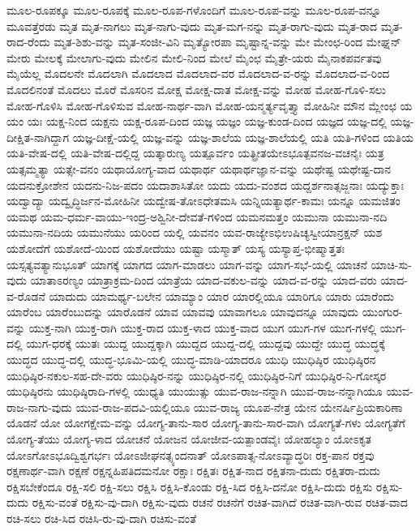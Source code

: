 {ಮೂಲ-ರೂಪಕ್ಕೂ
ಮೂಲ-ರೂಪಕ್ಕೆ
ಮೂಲ-ರೂಪ-ಗಳೊಂದಿಗೆ
ಮೂಲ-ರೂಪ-ವನ್ನು
ಮೂಲ-ರೂಪ-ವನ್ನೂ
ಮೂವತ್ತೆರಡು
ಮೃತ
ಮೃತ-ನಾಗಲು
ಮೃತ-ನಾಗು-ವುದು
ಮೃತ-ಮಗ-ನನ್ನು
ಮೃತ-ರಾಗು-ವುದು
ಮೃತ-ರಾದ
ಮೃತ-ರಾದ-ರೆಂದು
ಮೃತ-ಶಿಶು-ವನ್ನು
ಮೃತ-ಸಂಜೀ-ವಿನಿ
ಮೃತ್ಯೋರಪಾ
ಮೃಷ್ಟಾನ್ನ-ವನ್ನು
ಮೇ
ಮೇಂಛ-ರಿಂದ
ಮೇಘ್ನನ್
ಮೇರು
ಮೇಲಕ್ಕೆ
ಮೇಲಾಗು-ವುದು
ಮೇಲಿನ
ಮೇಲಿ-ನಿಂದ
ಮೇಲೆ
ಮೈಂಛ
ಮೈತ್ರೇ-ಯರು
ಮೈನಾಕಪರ್ವತವು
ಮೈಯೆಲ್ಲ
ಮೊದಲನೇ
ಮೊದಲಾಗಿ
ಮೊದಲಾದ
ಮೊದಲಾದ-ವರ
ಮೊದಲಾದ-ವ-ರನ್ನು
ಮೊದಲಾದ-ವ-ರಿಂದ
ಮೊದಲಿನಂತೆ
ಮೊದಲು
ಮೊರೆ
ಮೊಸರಿನ
ಮೋಕ್ಷ
ಮೋಕ್ಷ-ದಾತ
ಮೋಕ್ಷ-ವನ್ನು
ಮೋಹ
ಮೋಹ-ಗೊಳಿ-ಸಲು
ಮೋಹ-ಗೊಳಿಸಿ
ಮೋಹ-ಗೊಳಿಸುವ
ಮೋಹ-ನಾರ್ಥ-ವಾಗಿ
ಮೋಹ-ಯನ್ಮರ್ತ್ಯವೃತ್ತ್ಯಾ
ಮೋಹಿನೀ
ಮೌನ
ಮ್ಲೇಂಛ
ಯ
ಯಂ
ಯಃ
ಯಕ್ಷ-ನಿಂದ
ಯಕ್ಷನು
ಯಕ್ಷ-ರೂಪ-ದಿಂದ
ಯಜ್ಞ
ಯಜ್ಞಂ
ಯಜ್ಞ-ಕುಂಡ-ದಿಂದ
ಯಜ್ಞದ
ಯಜ್ಞ-ದಲ್ಲಿ
ಯಜ್ಞ-ದೀಕ್ಷಿತ-ನಾಗಿದ್ದಾಗ
ಯಜ್ಞ-ದೀಕ್ಷೆ-ಯಲ್ಲಿ
ಯಜ್ಞ-ವನ್ನು
ಯಜ್ಞ-ಶಾಲೆಯ
ಯಜ್ಞ-ಶಾಲೆಯಲ್ಲಿ
ಯತಿ
ಯತಿ-ಗಳಿಂದ
ಯತಿಯ
ಯತಿ-ವೇಷ-ದಲ್ಲಿ
ಯತಿ-ವೇಷ-ದಲ್ಲಿದ್ದ
ಯತ್ಕಾರುಣ್ಯ
ಯತ್ಪೂರ್ವಂ
ಯತ್ಪ್ರೀತಯೇಽಭೂತ್ಪವನಜ-ವಚನೈಃ
ಯತ್ರ
ಯತ್ಸಮ್ಮತ್ಯಾ
ಯತ್ಸೇ-ವನಂ
ಯಥಾಯೋಗ್ಯ-ವಾದ
ಯಥಾರ್ಥ
ಯಥಾರ್ಥಜ್ಞಾನ-ವನ್ನು
ಯಥೇಷ್ಟ
ಯಥೇಷ್ಟ-ದಾನ
ಯದನುಕ್ರೋಶೇನ
ಯದನು-ನಿಜ-ಪದಂ
ಯದಾಶಾಸಿತೋ
ಯದು
ಯದು-ವಂಶದ
ಯದ್ದರ್ಶನಾತ್ಸಜ್ಜನಾಃ
ಯದ್ಯುಕ್ತಾಃ
ಯದ್ವಾದ್ಯಾ
ಯದ್ವೃದ್ಧಿರ್ಜನ-ಮೋಹಿನೀ
ಯದ್ವೇಷ-ತೋಽಧೇತಮಸಿ
ಯನ್ನಿಯತ್ಯಾರ್ಥ-ಕಾಮಃ
ಯನ್ನೂ
ಯಮಜಿತಂ
ಯಮಥ
ಯಮ-ಧರ್ಮ-ವಾಯು-ಇಂದ್ರ-ಅಶ್ವಿನೀ-ದೇವತೆ-ಗಳಿಂದ
ಯಮನಮತ್ತಂ
ಯಮುನಾ
ಯಮುನಾ-ನದಿ
ಯಮುನಾ-ನದಿಯ
ಯಮುನೆಯು
ಯರಿಂದ
ಯಲ್ಲಿ
ಯವನಂ
ಯವ-ರಾಜ್ಯೇಽಭಿಉಷಿಚ್ಯಸ್ವೀಯಾನ್ರಕ್ಷನ್
ಯಶ
ಯಶೋದೆಗೆ
ಯಶೋದೆ-ಯಿಂದ
ಯಶೋದೆಯು
ಯಷ್ಟಾ
ಯಸ್ಮಾತ್
ಯಸ್ಯ
ಯಸ್ಯಾಪ್ತ-ಭೀಷ್ಮಾತ್ತತಃ
ಯಸ್ಸತ್ಯವತ್ಯಾನುಭೂತ್
ಯಾಗಕ್ಕೆ
ಯಾಗದ
ಯಾಗ-ಮಾಡಲು
ಯಾಗ-ವನ್ನು
ಯಾಗ-ಸಭೆ-ಯಲ್ಲಿ
ಯಾಚನೆ
ಯಾಚಿ-ಸು-ವುದು
ಯಾತಾಽರಣ್ಯಂ
ಯಾತ್ರಾಕ್ರಮ-ದಿಂದ
ಯಾತ್ರೆಯ
ಯಾದ-ವಕುಲ-ವನ್ನು
ಯಾದ-ವ-ರನ್ನು
ಯಾದ-ವರು
ಯಾದ-ವ-ರೊಡನೆ
ಯಾದುದು
ಯಾಮರ್ಥ್ಯ-ಬಲೇನ
ಯಾಮ್ಯಾಂ
ಯಾರ
ಯಾರಲ್ಲಿಯೂ
ಯಾರಿಗೂ
ಯಾರು
ಯಾರೆಂದು
ಯಾರೆಂಬ
ಯಾರೆಂಬುದನ್ನು
ಯಾರೊಡನೆ
ಯಾವ
ಯಾವವು
ಯಾವಾಗಲೂ
ಯಾವುದನ್ನೂ
ಯಾವುದು
ಯುಂಗುರ-ವನ್ನು
ಯುಕ್ತ-ನಾಗಿ
ಯುಕ್ತ-ರಾಗಿ
ಯುಕ್ತ-ರಾದ
ಯುಕ್ತ-ಳಾದ
ಯುಕ್ತ-ವಾದ
ಯುಗ
ಯುಗ-ಗಳ
ಯುಗ-ಗಳಲ್ಲಿ
ಯುಗ-ದಲ್ಲಿ
ಯುಗ-ಧರಕ್ಕೆ
ಯುತಃ
ಯುದ್ದ
ಯುದ್ದಕ್ಕಾಗಿ
ಯುದ್ದದ
ಯುದ್ದ-ದಲ್ಲಿ
ಯುದ್ದವು
ಯುದ್ದೇ
ಯುದ್ಧ
ಯುದ್ಧಕ್ಕೆ
ಯುದ್ಧದ
ಯುದ್ಧ-ದಲ್ಲಿ
ಯುದ್ಧ-ಭೂಮಿ-ಯಲ್ಲಿ
ಯುದ್ಧ-ಮಾಡಿ-ಯಾದರೂ
ಯುಧಿ
ಯುಧಿಷ್ಠಿರ
ಯುಧಿಷ್ಠಿರನ
ಯುಧಿಷ್ಠಿರ-ನಕುಲ-ಸಹ-ದೇ-ವರು
ಯುಧಿಷ್ಠಿರ-ನನ್ನು
ಯುಧಿಷ್ಠಿರ-ನಲ್ಲಿ
ಯುಧಿಷ್ಠಿರ-ನಿಗೆ
ಯುಧಿಷ್ಠಿರ-ನಿ-ಗೋಸ್ಕರ
ಯುಧಿಷ್ಠಿರನು
ಯುಧಿಷ್ಠಿರಾದಿ-ಗಳಲ್ಲಿ
ಯುಧ್ಯತಿ
ಯುಯುತ್ಸು
ಯುವ-ರಾಜ-ನನ್ನಾಗಿ
ಯುವ-ರಾಜ-ನನ್ನಾಗಿಯೂ
ಯುವ-ರಾಜ-ನಾಗು-ವುದು
ಯುವ-ರಾಜ-ಪದವಿ-ಯಲ್ಲಿಯೂ
ಯುವ-ರಾಜ್ಯ
ಯೂಪ-ನೇತ್ರ
ಯೇನ
ಯೇನರ್ಷಿಪ್ರಿಯಕಾರಿಣಾ
ಯೊಡನೆ
ಯೋ
ಯೋಗಕ್ಷೇಮ-ವನ್ನು
ಯೋಗ್ಯ-ತಾನು-ಸಾರ
ಯೋಗ್ಯ-ತಾನು-ಸಾರ-ವಾಗಿ
ಯೋಗ್ಯತೆ-ಗಳು
ಯೋಗ್ಯತೆಗೆ
ಯೋಗ್ಯ-ತೆಯು
ಯೋಗ್ಯ-ಳಾದ
ಯೋಚನೆ
ಯೋಜನ
ಯೋಜೀವ-ಯತ್ಪಾಂಡವೈಃ
ಯೋಹಲ್ಯಾಂ
ಯೋಽಕೃತ
ಯೋಽಗೋಽಭೂದ್ವಿಶ್ವಗರ್ಭಃ
ಯೋಽಜೀಘನತ್ಸ್ಯಂದನಾತ್
ಯೋಽಪಾತ್ಸ-ನೋಽವ್ಯಾದ್ಧರಿಃ
ರಕ್ತ-ಪಾನ
ರಕ್ತವು
ರಕ್ಷಣಾರ್ಥ-ವಾಗಿ
ರಕ್ಷಣೆ
ರಕ್ಷನ್ನಹಿಪತಿದಮನೋ
ರಕ್ಷಾಃ
ರಕ್ಷಿತಃ
ರಕ್ಷಿತ-ನಾದ
ರಕ್ಷಿತನಾ-ದುದು
ರಕ್ಷಿತರಾ-ದುದು
ರಕ್ಷಿಸಬೇಕೆಂದೂ
ರಕ್ಷಿ-ಸಲಿ
ರಕ್ಷಿ-ಸಲು
ರಕ್ಷಿಸಿ
ರಕ್ಷಿಸಿ-ಕೊಂಡು
ರಕ್ಷಿ-ಸಿದ
ರಕ್ಷಿಸಿ-ದನೋ
ರಕ್ಷಿಸಿ-ದುದು
ರಕ್ಷಿಸು
ರಕ್ಷಿಸು-ದುದು
ರಕ್ಷಿಸು-ವಂತೆ
ರಕ್ಷಿಸು-ವು-ದಾಗಿ
ರಕ್ಷಿಸು-ವುದು
ರಚನೆ
ರಚನೆಗೆ
ರಚಿತ-ವಾಗಿದೆ
ರಚಿತ-ವಾಗಿ-ರುವ
ರಚಿತ-ವಾದ
ರಚಿ-ಸಲು
ರಚಿ-ಸಿದ
ರಚಿಸಿ-ರು-ವು-ದಾಗಿ
ರಚಿಸು-ವಂತೆ
}
